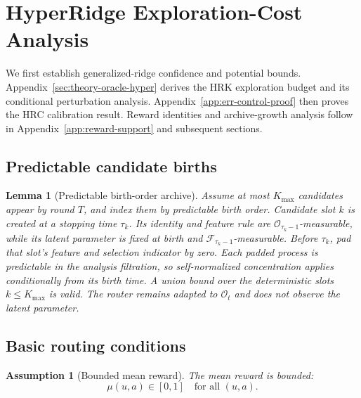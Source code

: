 \documentclass{article} %
\newtheorem{lemma}[theorem]{Lemma}
\newtheorem{assumption}{Assumption}
\begin{document}



\clearpage

\appendix

\section{HyperRidge Exploration-Cost Analysis}
\label{app:hyper-proofs}

We first establish generalized-ridge confidence and potential bounds.
Appendix~\ref{sec:theory-oracle-hyper} derives the HRK exploration budget
and its conditional perturbation analysis.
Appendix~\ref{app:err-control-proof} then proves the HRC calibration result.
Reward identities and archive-growth analysis follow in
Appendix~\ref{app:reward-support} and subsequent sections.

\subsection{Predictable candidate births}

\begin{lemma}[Predictable birth-order archive]
\label{lem:predictable}
Assume at most $K_{\max}$ candidates appear by round $T$, and index them by predictable birth order. Candidate slot $k$ is created at a stopping time $\tau_k$. Its identity and feature rule are $\mathcal O_{\tau_k-1}$-measurable, while its latent parameter is fixed at birth and $\mathcal F_{\tau_k-1}$-measurable. Before $\tau_k$, pad that slot's feature and selection indicator by zero. Each padded process is predictable in the analysis filtration, so self-normalized concentration applies conditionally from its birth time. A union bound over the deterministic slots $k\le K_{\max}$ is valid. The router remains adapted to \(\mathcal O_t\) and does not observe the latent parameter.
\end{lemma}

\subsection{Basic routing conditions}
\label{app:routing-conditions}

\begin{assumption}[Bounded mean reward]
\label{ass:bounded}
The mean reward is bounded:
\begin{equation}
\label{eq:ass-bounded}
\mu(u,a) \in [0,1] \quad \text{for all } (u,a).
\end{equation}
\end{assumption}
\end{document}
